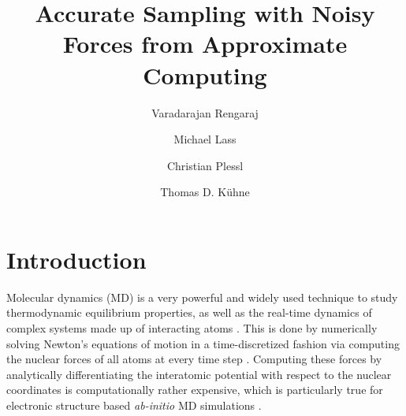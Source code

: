 \documentclass[format=acmsmall,authorversion,nonacm,timestamp,urlbreakonhyphens]{acmart}
\begin{document}
\title{Accurate Sampling with Noisy Forces from Approximate Computing}

\author{Varadarajan Rengaraj}

\author{Michael Lass}

\author{Christian Plessl}

\author{Thomas D. K\"uhne}

\maketitle


\section{Introduction}

Molecular dynamics (MD) is a very powerful and widely used technique to study thermodynamic equilibrium properties, as well as the real-time dynamics of complex systems made up of interacting atoms \cite{AlderWainwright1957}. This is done by numerically solving Newton's equations of motion in a time-discretized fashion via computing the nuclear forces of all atoms at every time step \cite{RahmanMD}. Computing these forces by analytically differentiating the interatomic potential with respect to the nuclear coordinates is computationally rather expensive, which is particularly true for electronic structure based \textit{ab-initio} MD simulations \cite{CPMD, CPMD_TDK, PayneRMP, WIRES_TDK}.
\end{document}
